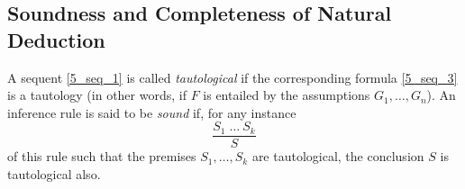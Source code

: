 \begin{enumerate}
\begin{table}[H]
\begin{center}
\begin{tabular}{llll}
\end{tabular}
\end{center}
\end{table}

\end{enumerate}

\newpage

\subsection{Soundness and Completeness of Natural Deduction}
A sequent \eqref{5_seq_1} is called \textit{tautological} if the corresponding formula \eqref{5_seq_3} is a tautology (in other words, if $F$ is entailed by the assumptions $G_1, \ldots, G_n$). An inference rule is said to be \textit{sound} if, for any instance
\begin{equation*}
    \frac{S_1 \; \ldots \: S_k}{S}
\end{equation*}
of this rule such that the premises $S_1, \ldots, S_k$ are tautological, the conclusion $S$ is tautological also.


